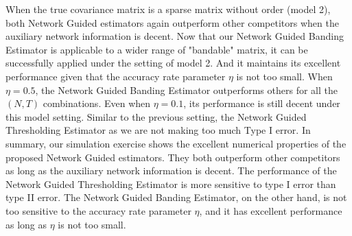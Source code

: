 When the true covariance matrix is a sparse matrix without order (model 2), both Network Guided estimators again outperform other competitors when the auxiliary network information is decent. Now that our Network Guided Banding Estimator is applicable to a wider range of "bandable" matrix, it can be successfully applied under the setting of model 2. And it maintains its excellent performance given that the accuracy rate parameter $\eta$ is not too small. When $\eta=0.5$, the Network Guided Banding Estimator outperforms others for all the $(N,T)$ combinations. Even when $\eta=0.1$, its performance is still decent under this model setting. Similar to the previous setting, the Network Guided Thresholding Estimator as we are not making too much Type I error.  In summary, our simulation exercise shows the excellent numerical properties of the proposed Network Guided estimators. They both outperform other competitors as long as the auxiliary network information is decent. The performance of the Network Guided Thresholding Estimator is more sensitive to type I error than type II error. The Network Guided Banding Estimator, on the other hand, is not too sensitive to the accuracy rate parameter $\eta$, and it has excellent performance as long as $\eta$ is not too small.

\begin{landscape}
        
        
\end{landscape}

